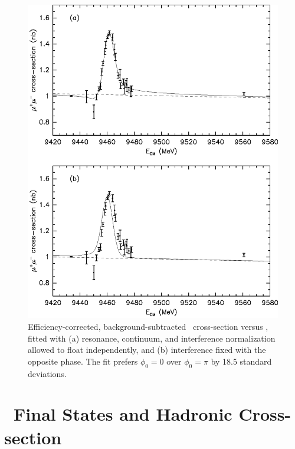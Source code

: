 \documentclass{cornell}
\begin{document}
\begin{figure}
  \begin{center}
    \includegraphics[width=0.9\linewidth]{newmumu}
  \end{center}
  \caption[Interference in the \mumu\ channel]{\label{newmumu}
  Efficiency-corrected, background-subtracted \mumu\ cross-section
  versus \ecm, fitted with (a) resonance, continuum, and interference
  normalization allowed to float independently, and (b) interference
  fixed with the opposite phase.  The fit prefers $\phi_0=0$ over
  $\phi_0=\pi$ by 18.5 standard deviations.}
\end{figure}

\section{\boldmath \ups\ Final States and Hadronic Cross-section}
\end{document}
